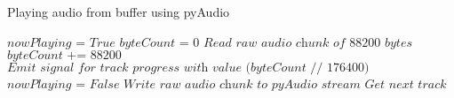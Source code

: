 \documentclass{article}
\begin{document}
\begin{algorithm}
\caption{Playing audio from buffer using pyAudio}
\begin{algorithmic}[1]
\State $\textit{nowPlaying = True}$
\State $\textit{byteCount = 0}$
\State $\textit{Read raw audio chunk of 88200 bytes}$
\State $\textit{byteCount += 88200}$
\State $\textit{Emit signal for track progress with value (byteCount // 176400)}$
\State $\textit{nowPlaying = False}$
\Else
\State $\textit{Write raw audio chunk to pyAudio stream}$
\EndIf
\EndWhile
\State $\textit{Get next track}$
\EndProcedure
\end{algorithmic}
\end{algorithm}
\end{document}
